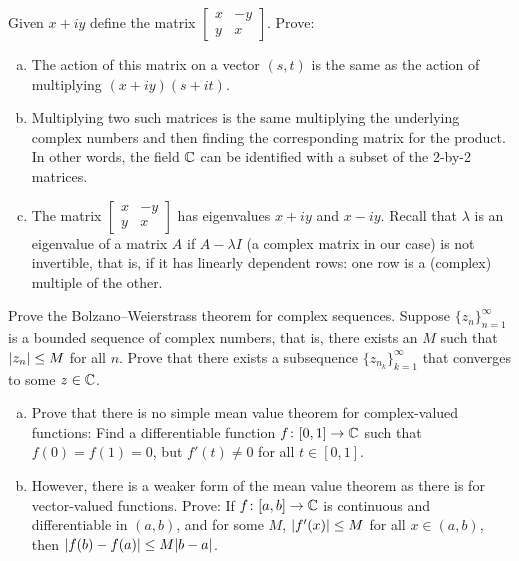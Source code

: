 \begin{samepage}
\begin{exercise}
Given $x +iy$ define the matrix
$\left[ \begin{smallmatrix} x & -y \\ y & x \end{smallmatrix} \right]$.
Prove:
\begin{enumerate}[a)]
\item
The action of this matrix on a vector $(s,t)$ is the same
as the action of multiplying $(x+iy)(s+it)$.
\item
Multiplying two such matrices is the same multiplying the underlying complex
numbers and then finding the corresponding matrix for the product.
In other words, the field ${\mathbb{C}}$ can be identified with a subset of the 2-by-2 matrices.
\item
The matrix
$\left[ \begin{smallmatrix} x & -y \\ y & x \end{smallmatrix} \right]$
has eigenvalues $x+iy$ and $x-iy$.  Recall that $\lambda$ is
an eigenvalue of a matrix $A$ if $A-\lambda I$ (a complex matrix in our case)
is not invertible, that is,
if it has linearly dependent rows: one row is a (complex) multiple
of the other.
\end{enumerate}
\end{exercise}
\end{samepage}

\begin{exercise}
Prove the Bolzano--Weierstrass theorem for complex sequences.
Suppose $\{ z_n \}_{n=1}^\infty$ is a bounded sequence of complex numbers, that
is, there exists an $M$ such that $\lvert {z_n} \rvert \leq M$ for all $n$.  Prove
that there exists a subsequence $\{ z_{n_k} \}_{k=1}^\infty$ that converges to some $z
\in {\mathbb{C}}$.
\end{exercise}

\begin{exercise}
\leavevmode
\begin{enumerate}[a)]
\item
Prove that there is no simple mean value theorem for complex-valued
functions:  Find a differentiable function $f \colon [0,1] \to {\mathbb{C}}$ such that
$f(0) = f(1) = 0$, but $f'(t) \not= 0$ for all $t \in [0,1]$.
\item
However, there is a weaker form of the mean value theorem as there is for vector-valued
functions.  Prove: If $f \colon [a,b] \to {\mathbb{C}}$ is continuous and differentiable in
$(a,b)$, and for some $M$, $\lvert {f'(x)} \rvert \leq M$ for all $x \in (a,b)$, then
$\lvert {f(b)-f(a)} \rvert \leq M \lvert {b-a} \rvert$.
\end{enumerate}
\end{exercise}

